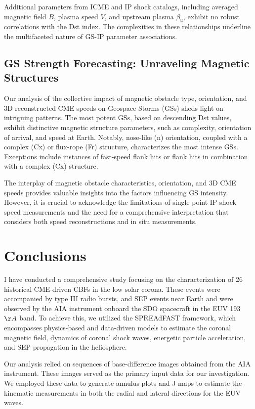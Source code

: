 Additional parameters from ICME and IP shock catalogs, including averaged magnetic field $B$, plasma speed $V$, and upstream plasma $\beta_u$, exhibit no robust correlations with the Dst index. The complexities in these relationships underline the multifaceted nature of GS-IP parameter associations.

\subsection{GS Strength Forecasting: Unraveling Magnetic Structures}
Our analysis of the collective impact of magnetic obstacle type, orientation, and 3D reconstructed CME speeds on Geospace Storms (GSs) sheds light on intriguing patterns. The most potent GSs, based on descending Dst values, exhibit distinctive magnetic structure parameters, such as complexity, orientation of arrival, and speed at Earth. Notably, nose-like (n) orientation, coupled with a complex (Cx) or flux-rope (Fr) structure, characterizes the most intense GSs. Exceptions include instances of fast-speed flank hits or flank hits in combination with a complex (Cx) structure.

The interplay of magnetic obstacle characteristics, orientation, and 3D CME speeds provides valuable insights into the factors influencing GS intensity. However, it is crucial to acknowledge the limitations of single-point IP shock speed measurements and the need for a comprehensive interpretation that considers both speed reconstructions and in situ measurements.

\section{Conclusions}
I have conducted a comprehensive study focusing on the characterization of 26 historical CME-driven CBFs in the low solar corona. These events were accompanied by type III radio bursts, and SEP events near Earth and were observed by the AIA instrument onboard the SDO spacecraft in the EUV 193 $\AA$ band. To achieve this, we utilized the SPREAdFAST framework, which encompasses physics-based and data-driven models to estimate the coronal magnetic field, dynamics of coronal shock waves, energetic particle acceleration, and SEP propagation in the heliosphere.

Our analysis relied on sequences of base-difference images obtained from the AIA instrument. These images served as the primary input data for our investigation. We employed these data to generate annulus plots and J-maps to estimate the kinematic measurements in both the radial and lateral directions for the EUV waves.

